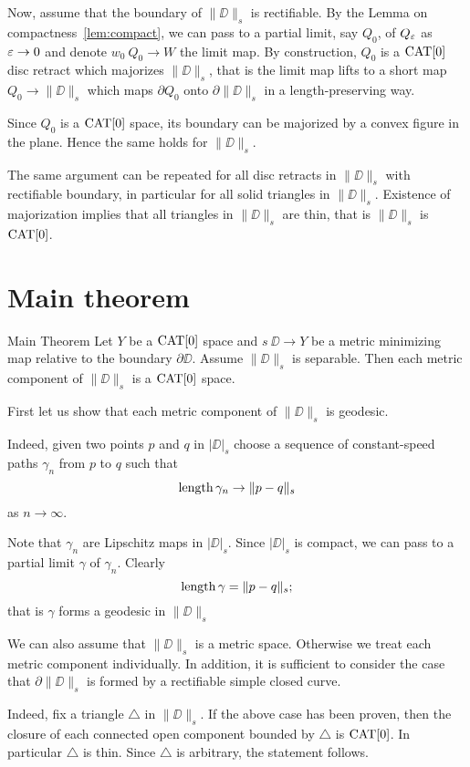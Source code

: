 \documentclass[a4paper,10pt]{amsart}
\begin{document}
Now, assume that the boundary of $\|\DD\|_s$ is rectifiable.
By the Lemma on compactness~\ref{lem:compact},
we can pass to a partial limit, say $Q_0$, of $Q_\varepsilon$ as $\varepsilon\to 0$ and denote $w_0\:Q_0\to W$ the limit map.
By construction, $Q_0$ is a $\mathop{\rm CAT}\nolimits[0]$ disc retract which majorizes $\|\DD\|_s$,
that is the limit map lifts to a short map $Q_0\to \|\DD\|_s$ which maps $\partial Q_0$ onto  $\partial \|\DD\|_s$ in a length-preserving way.

Since $Q_0$ is a $\mathop{\rm CAT}\nolimits[0]$ space, its boundary can be majorized by a convex figure in the plane.
Hence the same holds for $\|\DD\|_s$.

The same argument can be repeated for all disc retracts in $\|\DD\|_s$ with rectifiable boundary, in particular for all solid triangles in $\|\DD\|_s$.
Existence of majorization implies that all triangles in $\|\DD\|_s$ are thin, that is $\|\DD\|_s$ is $\mathop{\rm CAT}\nolimits[0]$.
\qeds

\section{Main theorem}

\begin{thm}{Main Theorem}\label{thm:main}
Let $Y$ be a $\mathop{\rm CAT}\nolimits[0]$ space 
and $s\:\DD\to Y$ be a metric minimizing map relative to the boundary $\partial\DD$.
Assume $\|\DD\|_s$  is separable. 
Then each metric component of $\|\DD\|_s$ is a $\mathop{\rm CAT}\nolimits[0]$ space. 
\end{thm}

First let us show that each metric component of $\|\DD\|_s$ is geodesic.

Indeed, given two points $p$ and $q$ in $|\DD|_s$ 
choose a sequence of constant-speed paths $\gamma_n$ from $p$ to $q$
such that 
\[\mathop{\rm length}\nolimits\gamma_n\to \|p-q\|_s\]
as $n\to\infty$.

Note that $\gamma_n$ are Lipschitz maps in $|\DD|_s$.
Since $|\DD|_s$ is compact, we can pass to a partial limit $\gamma$ of $\gamma_n$.
Clearly \[\mathop{\rm length}\nolimits\gamma= \|p-q\|_s;\]
that is $\gamma$ forms a geodesic in $\|\DD\|_s$

We can also assume that $\|\DD\|_s$ is a metric space. Otherwise we treat each metric component 
individually.
In addition, it is sufficient to consider
the case that $\partial \|\DD\|_s$ is formed by a rectifiable simple closed curve.

Indeed, fix a triangle $\triangle$ in $\|\DD\|_s$. 
If the above case has been proven, 
then the closure of each connected open component bounded by $\triangle$ is $\mathop{\rm CAT}\nolimits[0]$.
In particular $\triangle$ is thin.
Since $\triangle$ is arbitrary, the statement follows.
\end{document}
